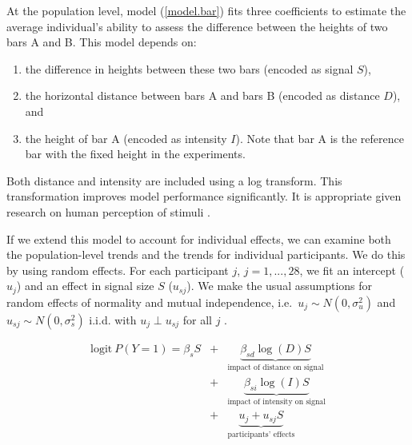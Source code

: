 At the population level, model (\autoref{model.bar}) fits three coefficients to estimate the average individual's ability to assess the difference between the heights of two bars A and B. This model depends on: 

\begin{enumerate}
    \item the difference in heights between these two bars (encoded as signal $S$), 
    \item the horizontal distance between bars A and bars B (encoded as distance $D$), and 
    \item the height of bar A (encoded as intensity $I$). Note that bar A is the reference bar with the fixed height in the experiments.
\end{enumerate}

Both distance and intensity are included using a log transform. This transformation improves model performance significantly. It is appropriate given research on human perception of stimuli \cite{logPerception}.

If we extend this model to account for individual effects, we can examine both the population-level trends and the trends for individual participants.
We do this by using random effects. For each participant $j$, $j = 1, ..., 28$, we fit an intercept ($u_{j}$) and an effect in signal size $S$ ($u_{sj}$). 
We make the usual assumptions for random effects of normality and mutual independence, i.e.\ $u_{j} \sim N(0, \sigma_u^2)$ and $u_{sj} \sim N(0, \sigma_s^2)$
i.i.d. with $u_{j} \perp u_{sj}$ for all $j$ .

\begin{eqnarray} \nonumber
\label{model.bar}
\text{logit}~P(Y = 1) = \beta_s S &+& \underbrace{\beta_{sd} \log(D) S}_{\text{impact of distance on signal}}  \\ \nonumber
&+& \underbrace{\beta_{si} \log(I) S}_{\text{impact of intensity on signal}} \\ 
&+& \underbrace{u_j + u_{sj} S}_{\text{participants' effects}}
\end{eqnarray}


